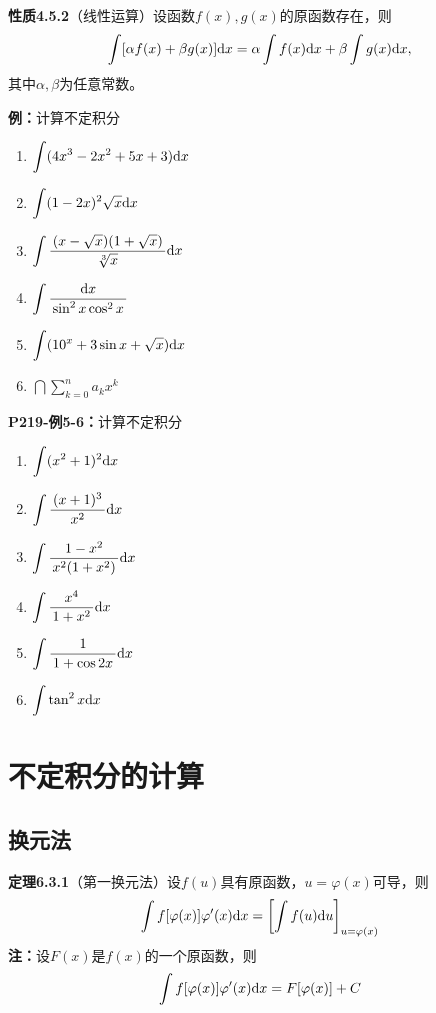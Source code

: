 {\bf 性质4.5.2}（线性运算）设函数$f(x),g(x)$的原函数存在，则
$$\int[\alpha f(x)+\beta g(x)]\mathrm{d} x=\alpha\int f(x)\mathrm{d} x+\beta\int g(x)\mathrm{d} x,$$
其中$\alpha,\beta$为任意常数。

{\bf 例：}计算不定积分
\begin{enumerate}[(1)]
  \setlength{\itemindent}{1cm}
  \item $\displaystyle\int (4x^3-2x^2+5x+3)\mathrm{d} x$
  \item $\displaystyle\int(1-2x)^2\sqrt x\mathrm{d} x$
  \item $\displaystyle\int\displaystyle\frac{\,{(x-\sqrt x)(1+\sqrt x)}\,}{\,{\sqrt[3]x}\,}\mathrm{d} x$
  \item $\displaystyle\int\displaystyle\frac{\,{\mathrm{d} x}\,}{\,{\sin^2x\cos^2x}\,}$
  \item $\displaystyle\int(10^x+3\sin x+\sqrt x)\mathrm{d} x$
  \item $\dint\sum\limits_{k=0}^na_kx^k$
\end{enumerate}

{\bf P219-例5-6：}计算不定积分
\begin{enumerate}[(1)]
  \setlength{\itemindent}{1cm}
  \item $\displaystyle\int (x^2+1)^2\mathrm{d} x$ 
  \item $\displaystyle\int\displaystyle\frac{\,{(x+1)^3}\,}{\,{x^2}\,}\mathrm{d} x$ 
  \item $\displaystyle\int\displaystyle\frac{\,{1-x^2}\,}{\,{x^2(1+x^2)}\,}\mathrm{d} x$
  \item $\displaystyle\int \displaystyle\frac{\,{x^4}\,}{\,{1+x^2}\,}\mathrm{d} x$ 
  \item $\displaystyle\int\displaystyle\frac{\,{1}\,}{\,{1+\cos 2x}\,}\mathrm{d} x$ 
  \item $\displaystyle\int\tan^2 x\mathrm{d} x$
\end{enumerate}

\section{不定积分的计算}

\subsection{换元法}

{\bf 定理6.3.1}（第一换元法）设$f(u)$具有原函数，$u=\varphi(x)$可导，则
$$\displaystyle\int f[\varphi(x)]\varphi'(x)\mathrm{d} x=\left[\displaystyle\int f(u)
\mathrm{d} u\right]_{u=\varphi(x)}$$
{\bf 注：}设$F(x)$是$f(x)$的一个原函数，则
$$\displaystyle\int f[\varphi(x)]\varphi'(x)\mathrm{d} x=F[\varphi(x)]+C$$


